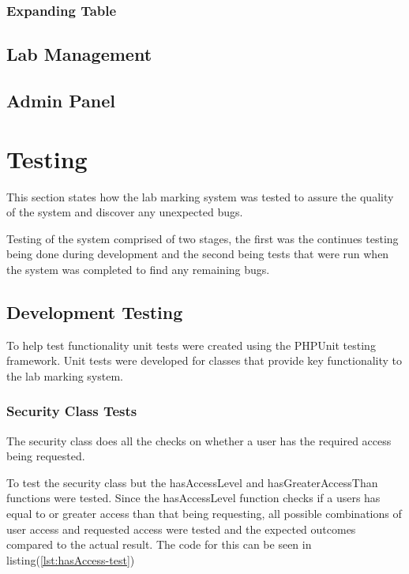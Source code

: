 \documentclass[12pt]{article}  %
\begin{document}
\subsubsection{Expanding Table}




\subsection{Lab Management}

\subsection{Admin Panel}






\newpage
\section{Testing}

This section states how the lab marking system was tested to assure the quality of the system and discover any unexpected bugs.

Testing of the system comprised of two stages, the first was the continues testing being done during development and the second being tests that were run when the system was completed to find any remaining bugs.


\subsection{Development Testing}
To help test functionality unit tests were created using the PHPUnit testing framework. Unit tests were developed for classes that provide key functionality to the lab marking system. 

\subsubsection{Security Class Tests}

The security class does all the checks on whether a user has the required access being requested. 

To test the security class but the hasAccessLevel and hasGreaterAccessThan functions were tested. Since the hasAccessLevel function checks if a users has equal to or greater access than that being requesting, all possible combinations of user access and requested access were tested and the expected outcomes compared to the actual result. The code for this can be seen in listing(\ref{lst:hasAccess-test})
\end{document}
